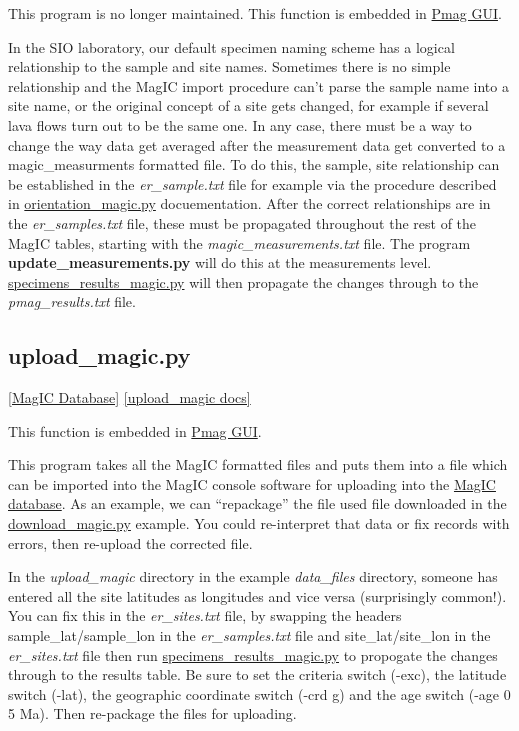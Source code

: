 \documentclass[11pt]{book}
\begin{document}
{{{This program is no longer maintained. This function is embedded in  \href{#pmag_gui.py}{Pmag GUI}.



In the SIO laboratory, our default specimen naming scheme has a logical relationship to the sample and site names.
Sometimes there is no simple relationship and the MagIC import procedure can't parse the sample name into a site name, or the original concept of a site gets changed, for example if several lava flows turn out to be the same one.  In any case, there must be a way to change the way data get averaged after the measurement data get converted to a magic\_measurments formatted file.  To do this, the sample, site relationship can be established in the {\it er\_sample.txt} file for example via the procedure described in \href{#orientation_magic.py}{orientation\_magic.py} docuementation.  After the correct relationships are in the {\it er\_samples.txt} file, these must be propagated throughout the rest of the MagIC tables, starting with the {\it magic\_measurements.txt} file.  The program {\bf update\_measurements.py} will do this at the measurements level.  \href{#specimens_results_magic.py}{specimens\_results\_magic.py} will then propagate the changes through to the {\it pmag\_results.txt} file.



\subsection{upload\_magic.py}
\href{#MagICDatabase}{[MagIC Database]}
\href{https://github.com/PmagPy/PmagPy/blob/master/programs/upload_magic.py}{[upload\_magic docs]}


 This function is embedded in  \href{#pmag_gui.py}{Pmag GUI}.



This program takes all the MagIC formatted files and puts them into a file which can be imported into the MagIC console software for uploading into the \href{http://earthref.org/MagIC}{MagIC database}.
As an example, we can ``repackage'' the file used file downloaded in the \href{#download_magic.py}{download\_magic.py} example.  You could re-interpret that data or fix records with errors, then re-upload the corrected file.

In the {\it upload\_magic} directory in the example {\it data\_files} directory, someone has entered all the site latitudes as longitudes and vice versa (surprisingly common!).    You can fix this in the {\it er\_sites.txt} file, by swapping the headers sample\_lat/sample\_lon in the {\it er\_samples.txt} file and site\_lat/site\_lon in the {\it er\_sites.txt} file then run \href{#specimens\_results\_magic.py}{specimens\_results\_magic.py} to propogate the changes through to the results table.  Be sure to set the criteria switch (-exc), the latitude switch (-lat), the geographic coordinate switch (-crd g) and the age switch (-age 0 5 Ma).    Then re-package the files for uploading.

}}}
\end{document}
